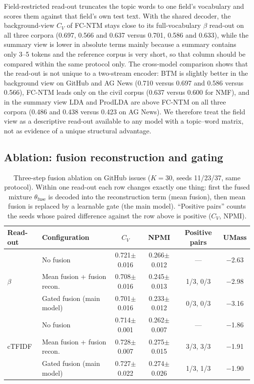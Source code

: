 \documentclass[11pt]{article}
\newcommand{\fcntm}{FC-NTM}
\begin{document}
Field-restricted read-out truncates the topic words to one field's vocabulary and scores them
against that field's own test text. With the shared decoder, the background-view $C_V$ of
\fcntm{} stays close to its full-vocabulary $\beta$ read-out on all three corpora (0.697, 0.566
and 0.637 versus 0.701, 0.586 and 0.633), while the summary view is lower in absolute terms mainly
because a summary contains only 3--5 tokens and the reference corpus is very short, so that column
should be compared within the same protocol only. The cross-model comparison shows that the
read-out is not unique to a two-stream encoder: BTM is slightly better in the background view on
GitHub and AG News (0.710 versus 0.697 and 0.586 versus 0.566), \fcntm{} leads only on the civil
corpus (0.637 versus 0.600 for NMF), and in the summary view LDA and ProdLDA are above \fcntm{}
on all three corpora (0.486 and 0.438 versus 0.423 on AG News). We therefore treat the field view
as a descriptive read-out available to any model with a topic--word matrix, not as evidence of a
unique structural advantage.

\subsection{Ablation: fusion reconstruction and gating}

\begin{table}[t]
\centering
\caption{Three-step fusion ablation on GitHub issues ($K=30$, seeds 11/23/37, same protocol). Within one read-out each row changes exactly one thing: first the fused mixture $\theta_{\mathrm{fuse}}$ is decoded into the reconstruction term (mean fusion), then mean fusion is replaced by a learnable gate (the main model). ``Positive pairs'' counts the seeds whose paired difference against the row above is positive ($C_V$, NPMI).}
\label{tab:fusion}
\small
\begin{tabular}{llcccc}
\toprule
Read-out & Configuration & $C_V$ & NPMI & Positive pairs & UMass \\
\midrule
\multirow{3}{*}{$\beta$} & No fusion & 0.721$\pm$0.016 & 0.266$\pm$0.012 & --- & $-$2.63 \\
 & Mean fusion + fusion recon. & 0.708$\pm$0.016 & 0.245$\pm$0.013 & 1/3, 0/3 & $-$2.98 \\
 & Gated fusion (main model) & 0.701$\pm$0.016 & 0.233$\pm$0.012 & 0/3, 0/3 & $-$3.16 \\
\midrule
\multirow{3}{*}{cTFIDF} & No fusion & 0.714$\pm$0.001 & 0.262$\pm$0.007 & --- & $-$1.86 \\
 & Mean fusion + fusion recon. & 0.728$\pm$0.007 & 0.275$\pm$0.015 & 3/3, 3/3 & $-$1.91 \\
 & Gated fusion (main model) & 0.727$\pm$0.022 & 0.274$\pm$0.026 & 1/3, 1/3 & $-$1.90 \\
\bottomrule
\end{tabular}
\end{table}
\end{document}
